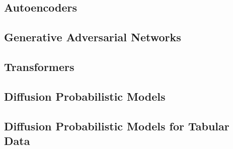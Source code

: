 \subsection{Autoencoders}
\label{ch:preliminaries-generativeAlgorithms-variationalAutoencoders}



\subsection{Generative Adversarial Networks}
\label{ch:preliminaries-generativeAlgorithms-generativeAdversarialNetworks}



\subsection{Transformers}
\label{ch:preliminaries-generativeAlgorithms-transformers}



\subsection{Diffusion Probabilistic Models}
\label{ch:preliminaries-generativeAlgorithms-diffusionProbabilisticModels}


\subsection{Diffusion Probabilistic Models for Tabular Data}
\label{ch:preliminaries-generativeAlgorithms-diffusionProbabilisticModelsTabularData}




